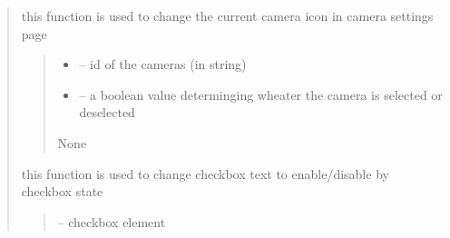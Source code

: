 \documentclass[letterpaper,10pt,english]{sphinxmanual}
\begin{document}
\begin{quote}
\begin{savenotes}
\begin{fulllineitems}
\begin{savenotes}
\begin{fulllineitems}
\begin{quote}
\begin{description}
\end{description}\end{quote}

\end{fulllineitems}\end{savenotes}


\begin{savenotes}\begin{fulllineitems}
\label{\detokenize{setting/setting_UI:oxin.setting_UI.UI_main_window.change_camera_btn_icon}}
\pysigstartsignatures
{}
\pysigstopsignatures
\sphinxAtStartPar
this function is used to change the current camera icon in camera settings page
\begin{quote}\begin{description}
\begin{itemize}
\item {} 
\sphinxAtStartPar
{} – id of the cameras (in string)

\item {} 
\sphinxAtStartPar
{} – a boolean value determinging wheater the camera is selected or deselected

\end{itemize}

\sphinxAtStartPar
None

\end{description}\end{quote}

\end{fulllineitems}\end{savenotes}


\begin{savenotes}\begin{fulllineitems}
\label{\detokenize{setting/setting_UI:oxin.setting_UI.UI_main_window.check_box_state}}
\pysigstartsignatures
{}
\pysigstopsignatures
\sphinxAtStartPar
this function is used to change checkbox text to enable/disable by checkbox state
\begin{quote}\begin{description}
\sphinxAtStartPar
{} – checkbox element


\end{description}
\end{quote}
\end{fulllineitems}
\end{savenotes}
\end{fulllineitems}
\end{savenotes}
\end{quote}
\end{document}
